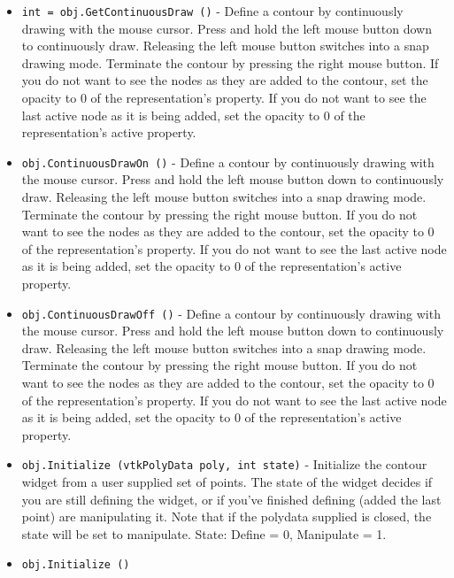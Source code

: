 \begin{itemize}
\item  \verb|int = obj.GetContinuousDraw ()| -  Define a contour by continuously drawing with the mouse cursor.
 Press and hold the left mouse button down to continuously draw.
 Releasing the left mouse button switches into a snap drawing mode.
 Terminate the contour by pressing the right mouse button.  If you
 do not want to see the nodes as they are added to the contour, set the
 opacity to 0 of the representation's property.  If you do not want to 
 see the last active node as it is being added, set the opacity to 0 
 of the representation's active property.

\item  \verb|obj.ContinuousDrawOn ()| -  Define a contour by continuously drawing with the mouse cursor.
 Press and hold the left mouse button down to continuously draw.
 Releasing the left mouse button switches into a snap drawing mode.
 Terminate the contour by pressing the right mouse button.  If you
 do not want to see the nodes as they are added to the contour, set the
 opacity to 0 of the representation's property.  If you do not want to 
 see the last active node as it is being added, set the opacity to 0 
 of the representation's active property.

\item  \verb|obj.ContinuousDrawOff ()| -  Define a contour by continuously drawing with the mouse cursor.
 Press and hold the left mouse button down to continuously draw.
 Releasing the left mouse button switches into a snap drawing mode.
 Terminate the contour by pressing the right mouse button.  If you
 do not want to see the nodes as they are added to the contour, set the
 opacity to 0 of the representation's property.  If you do not want to 
 see the last active node as it is being added, set the opacity to 0 
 of the representation's active property.

\item  \verb|obj.Initialize (vtkPolyData poly, int state)| -  Initialize the contour widget from a user supplied set of points. The
 state of the widget decides if you are still defining the widget, or
 if you've finished defining (added the last point) are manipulating
 it. Note that if the polydata supplied is closed, the state will be
 set to manipulate.
  State: Define = 0, Manipulate = 1.

\item  \verb|obj.Initialize ()|

\end{itemize}
